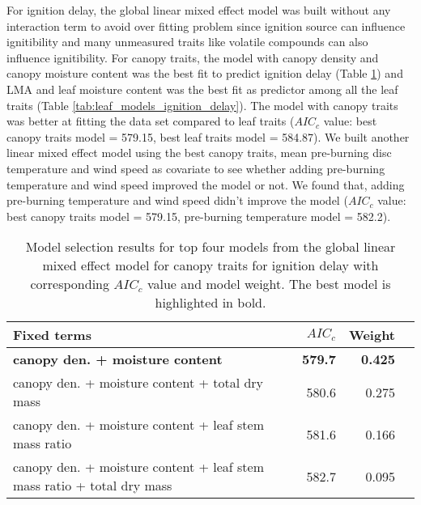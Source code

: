 \documentclass{ttuthes2007}
\begin{document}
\noindent For ignition delay, the global linear mixed effect model was built without any interaction term  to avoid over fitting problem since ignition source can influence ignitibility \citep{madrigal2012evaluation} and many unmeasured traits like volatile compounds can also influence ignitibility. For canopy traits, the model with canopy density and canopy moisture content was the best fit to predict ignition delay (Table \ref{tab:canopy_models_ignition_delay}) and LMA and leaf moisture content was the best fit as predictor among all the leaf traits (Table \ref{tab:leaf_models_ignition_delay}). The model with canopy traits was better at fitting the data set compared to leaf traits ($AIC_{c}$ value: best canopy traits model = 579.15, best leaf traits model = 584.87). We built another linear mixed effect model using the best canopy traits,  mean pre-burning disc temperature and wind speed as  covariate to see whether adding pre-burning temperature and wind speed improved the model or not. We found that, adding pre-burning temperature and wind speed didn't improve the model ($AIC_{c}$ value: best canopy traits model = 579.15, pre-burning temperature model = 582.2).



\begin{table}
  \centering
  \caption{Model selection results for top four models from the global linear
    mixed effect model for canopy traits for ignition delay with corresponding
    $AIC_{c}$ value and model weight. The best model is highlighted in bold.}
  \begin{tabular}{lrrr}
    \toprule
    \textbf{Fixed terms} & $AIC_{c}$ & \textbf{Weight}\\
    \midrule
    \textbf{canopy den. + moisture content}    & \textbf{579.7} & \textbf{0.425} \\
    canopy den. + moisture content + total dry mass   & 580.6   & 0.275 \\
    canopy den. + moisture content + leaf stem mass ratio       & 581.6   & 0.166  \\
    canopy den. + moisture content + leaf stem mass ratio + total dry mass & 582.7  & 0.095 \\
    \bottomrule
  \end{tabular}
  \label{tab:canopy_models_ignition_delay}
\end{table}
\end{document}
